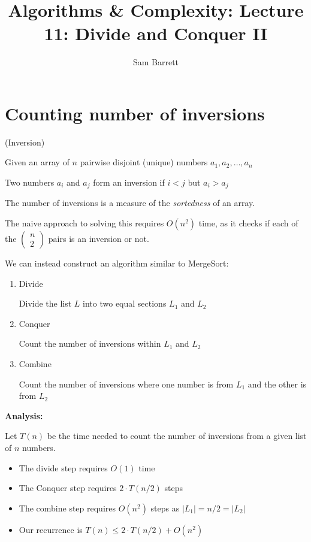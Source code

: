 \documentclass{article}
\title{Algorithms \& Complexity: Lecture 11: Divide and Conquer II}
\author{Sam Barrett}
\begin{document}
\maketitle

\section{Counting number of inversions}

\begin{problem}(Inversion)

  Given an array of $n$ pairwise disjoint (unique) numbers  $a_{1},a_{2},\ldots, a_{n}$

  Two numbers $a_{i}$ and $a_{j}$ form an inversion if $i < j$ but $a_{i} > a_{j}$
\end{problem}

The number of inversions is a measure of the \textit{sortedness}  of an array.

The naive approach to solving this requires $O(n^{2})$ time, as it checks if each of the $\begin{pmatrix}
n \\ 2
\end{pmatrix}$ pairs is an inversion or not.

We can instead construct an algorithm similar to MergeSort:

\begin{enumerate}
  \item Divide

        Divide the list $L$ into two equal sections $L_{1}$ and $L_{2}$


  \item Conquer

        Count the number of inversions within $L_{1}$ and $L_{2}$


  \item Combine

        Count the number of inversions where one number is from $L_{1}$ and the other is from $L_{2}$
\end{enumerate}

\textbf{Analysis:}

Let $T(n)$ be the time needed to count the number of inversions from a given list of $n$ numbers.

\begin{itemize}
  \item The divide step requires $O(1)$ time
  \item The Conquer step requires $2 \cdot T(n/2)$ steps
  \item The combine step requires $O(n^{2})$ steps as $|L_{1}| = n/2= |L_{2}|$
  \item Our recurrence is $T(n) \leq 2 \cdot T(n/2) + O(n^{2})$
\end{itemize}
\end{document}
